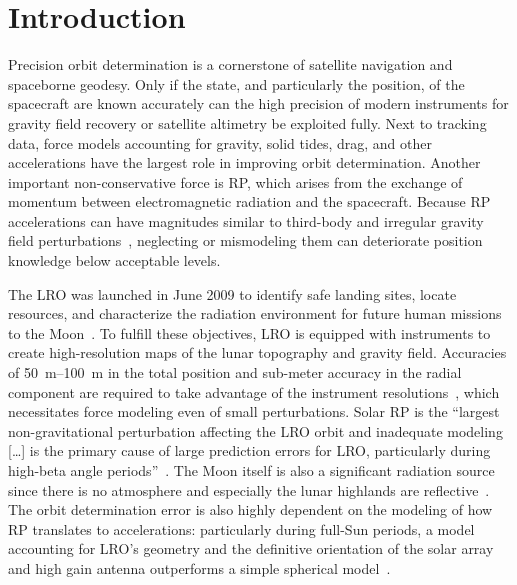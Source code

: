 \section{Introduction}
\label{sec:introduction}

Precision orbit determination is a cornerstone of satellite navigation and spaceborne geodesy. Only if the state, and particularly the position, of the spacecraft are known accurately can the high precision of modern instruments for gravity field recovery or satellite altimetry be exploited fully. Next to tracking data, force models accounting for gravity, solid tides, drag, and other accelerations have the largest role in improving orbit determination. Another important non-conservative force is \acrfull{RP}, which arises from the exchange of momentum between electromagnetic radiation and the spacecraft. Because \gls{RP} accelerations can have magnitudes similar to third-body and irregular gravity field perturbations~\cite{Montenbruck2000}, neglecting or mismodeling them can deteriorate position knowledge below acceptable levels.

The \acrfull{LRO} was launched in June 2009 to identify safe landing sites, locate resources, and characterize the radiation environment for future human missions to the Moon~\cite{Tooley2010}. To fulfill these objectives, \gls{LRO} is equipped with instruments to create high-resolution maps of the lunar topography and gravity field. Accuracies of \qtyrange{50}{100}{\m} in the total position and sub-meter accuracy in the radial component are required to take advantage of the instrument resolutions~\cite{Chin2007,Zuber2009}, which necessitates force modeling even of small perturbations. Solar \gls{RP} is the \enquote{largest non-gravitational perturbation affecting the LRO orbit and inadequate modeling [\ldots] is the primary cause of large prediction errors for LRO, particularly during high-beta angle periods}~\cite{Slojkowski2015}. The Moon itself is also a significant radiation source since there is no atmosphere and especially the lunar highlands are reflective~\cite{Floberghagen1999}. The orbit determination error is also highly dependent on the modeling of how \gls{RP} translates to accelerations: particularly during full-Sun periods, a model accounting for \gls{LRO}'s geometry and the definitive orientation of the solar array and high gain antenna outperforms a simple spherical model~\cite{Slojkowski2014}.
 
